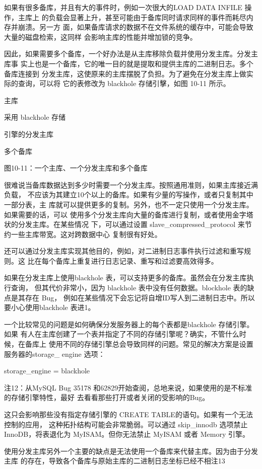 如果有很多备库，并且有大的事件时，例如一次很大的LOAD DATA INFILE 操作，主库上
的负载会显著上升，甚至可能由于备库同时请求同样的事件而耗尽内存并崩溃。另一方
面，如果备库请求的数据不在文件系统的缓存中，可能会导致大量的磁盘检索，这同样
会影响主库的性能并增加锁的竞争。

因此，如果需要多个备库，一个好办法是从主库移除负载并使用分发主库。分发主库事
实上也是一个备库，它的唯一目的就是提取和提供主库的二进制日志。多个备库连接到
分发主库，这使原来的主库摆脱了负担。为了避免在分发主库上做实际的查询，可以将
它的表修改为 blackhole 存储引擊，如图 10-11 所示。

主库

采用 blackhole 存储

引擎的分发主库

多个备库

图10-11：一个主库、一个分发主库和多个备库

很难说当备库数据达到多少时需要一个分发主库。按照通用准则，如果主库接近满负载，
不应该为其建立10个以上的备库。如果有少量的写操作，或者只复制其中一部分表，主
库就可以提供更多的复制。另外，也不一定只使用一个分发主库。如果需要的话，可以
使用多个分发主库向大量的备库进行复制，或者使用金字塔状的分发主库。在某些情况
下，可以通过设置 slave\_compressed\_protocol 来节约一些主库带宽。这对跨数据中心
复制很有好处。

还可以通过分发主库实现其他目的，例如，对二进制日志事件执行过滤和重写规则。这
比在每个备库上重复进行日志记录、重写和过滤要高效得多。

如果在分发主库上使用blackhole 表，可以支持更多的备库。虽然会在分发主库执行查询，
但其代价非常小，因为 blackhole 表中没有任何数据。blockhole 表的缺点是其存在 Bug，
例如在某些情况下会忘记将自增ID写人到二进制日志中。所以要小心使用blackhole
表进1。

一个比较常见的问题是如何确保分发服务器上的每个表都是blackhole 存储引擎。如果
有人在主库创建了一个表并指定了不同的存储引擎呢？确实，不管什么时候，在备库上
使用不同的存储引擎总会导致同样的问题。常见的解决方案是设置服务器的storage\_
engine 选项：

storage\_engine = blackhole

注12：从MySQL Bug 35178 和62829开始查阅，总地来说，如果使用的是不标准的存储引擎特性，最好
去看看那些打开或者关闭的受影响的Bug。

这只会影响那些没有指定存储引擎的 CREATE TABLE的语句。如果有一个无法控制的应用，
这种拓扑结构可能会非常脆弱。可以通过 skip\_innodb 选项禁止InnoDB，将表退化为
MyISAM。但你无法禁止 MyISAM 或者 Memory 引擎。

使用分发主库另外一个主要的缺点是无法使用一个备库来代替主库。因为由于分发主库
的存在，导致各个备库与原始主库的二进制日志坐标已经不相注13

